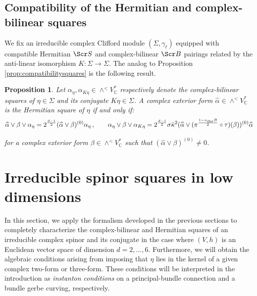 \documentclass[10pt,a4paper,twoside,reqno]{amsart}
\theoremstyle{plain}
\newtheorem{prop}[thm]{Proposition}
\theoremstyle{definition}
\theoremstyle{remark}
\def\C{\mathbb{C}}
\def\scB{\Scr B}
\def\scS{\Scr S}
\begin{document}

\subsection{Compatibility of the Hermitian and complex-bilinear squares}


We fix an irreducible complex Clifford module $(\Sigma,\gamma_\ell)$ equipped with compatible Hermitian $\scS$ and complex-bilinear $\scB$ pairings related by the anti-linear isomorphism $K\colon \Sigma \to \Sigma$. The analog to Proposition \ref{prop:compatibilitysquares} is the following result.

\begin{prop}
\label{prop:compatibilitysquares_odd}
Let $\alpha_{\eta} , \alpha_{K\eta} \in \wedge^<V^{\ast}_{\C}$ respectively denote the complex-bilinear squares of $\eta\in \Sigma$ and its conjugate $K\eta\in \Sigma$. A complex exterior form $\widehat{\alpha} \in \wedge^<V^{\ast}_{\C}$ is the Hermitian square of $\eta$ if and only if:
\begin{equation*}  
\widehat{\alpha} \vee \beta \vee \alpha_{\eta}  = 2^{\frac{d-1}{2}} (\widehat{\alpha} \vee \beta)^{(0)} \alpha_{\eta} \, , \qquad   \alpha_{\eta} \vee \beta \vee \alpha_{K\eta} = 2^{\frac{d-1}{2}} \sigma \bar{\kappa}^{2} (\widehat{\alpha} \vee (\pi^{\frac{1-s_\scB}{2}}\circ \tau)(\beta))^{(0)}  \widehat{\alpha}
\end{equation*}

\noindent
for a complex exterior form $\beta \in \wedge^<V^{\ast}_{\C}$ such that $(\widehat{\alpha} \vee \beta)^{(0)} \neq 0$.
\end{prop}


\section{Irreducible spinor squares in low dimensions}
\label{sec:lowdimensions}


In this section, we apply the formalism developed in the previous sections to completely characterize the complex-bilinear and Hermitian squares of an irreducible complex spinor and its conjugate in the case where $(V,h)$ is an Euclidean vector space of dimension $d=2,\ldots,6$. Furthermore, we will obtain the algebraic conditions arising from imposing that $\eta$ lies in the kernel of a given complex two-form or three-form. These conditions will be interpreted in the introduction as \emph{instanton conditions} on a principal-bundle connection and a bundle gerbe curving, respectively.
\end{document}
